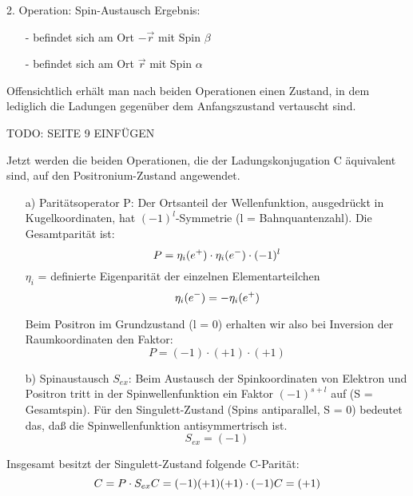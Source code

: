 2. Operation: Spin-Austausch
Ergebnis:
\begin{itemize}
 \item[-] \elektron befindet sich am Ort $-\vec{r}$ mit Spin $\beta$
 \item[-] \positron befindet sich am Ort $\vec{r}$ mit Spin $\alpha$
\end{itemize}
Offensichtlich erhält man nach beiden Operationen einen Zustand, in dem lediglich die Ladungen gegenüber dem Anfangszustand vertauscht sind.

TODO: SEITE 9 EINFÜGEN

Jetzt werden die beiden Operationen, die der Ladungskonjugation C äquivalent sind, auf den Positronium-Zustand angewendet.

\begin{itemize}
 \item[a)] Paritätsoperator P:
Der Ortsanteil der Wellenfunktion, ausgedrückt in Kugelkoordinaten, hat $(-1)^l$-Symmetrie (l = Bahnquantenzahl).
Die Gesamtparität ist:
\begin{equation*}
 P = \eta_i( e^+ ) \cdot \eta_i (e^-) \cdot (-1)^l
\end{equation*}
$\eta_i$ = definierte Eigenparität der einzelnen Elementarteilchen
\begin{equation*}
 \eta_i ( e^- ) = - \eta_i ( e^+ )
\end{equation*}

Beim Positron im Grundzustand (l = 0) erhalten wir also bei Inversion der Raumkoordinaten den Faktor:
\begin{equation*}
 P = (-1) \cdot (+1) \cdot (+1)
\end{equation*}

\item[b)] Spinaustausch $S_{ex}$:
Beim Austausch der Spinkoordinaten von Elektron und Positron tritt in der Spinwellenfunktion ein Faktor $(-1)^{s+l}$ auf (S = Gesamtspin). Für den Singulett-Zustand (Spins antiparallel, S = 0) bedeutet das, daß die Spinwellenfunktion antisymmertrisch ist.
\begin{equation*}
 S_{ex} = (-1)
\end{equation*}
\end{itemize}

Insgesamt besitzt der Singulett-Zustand folgende C-Parität:
\begin{equation*}
 C = P \cdot S_{ex} \\
 C = (-1)(+1)(+1)\cdot(-1) \\
 C = (+1)
\end{equation*} %

